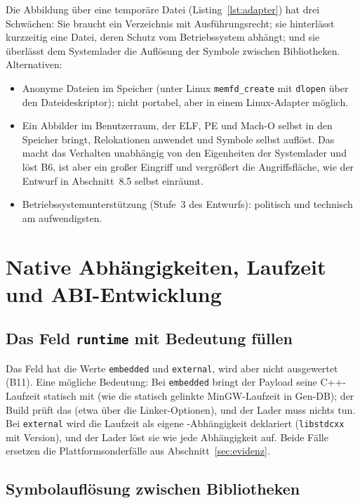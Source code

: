 Die Abbildung über eine temporäre Datei (Listing~\ref{lst:adapter}) hat drei Schwächen: Sie braucht ein Verzeichnis mit Ausführungsrecht; sie hinterlässt kurzzeitig eine Datei, deren Schutz vom Betriebssystem abhängt; und sie überlässt dem Systemlader die Auflösung der Symbole zwischen Bibliotheken. Alternativen:
\begin{itemize}
	\item Anonyme Dateien im Speicher (unter Linux \texttt{memfd\_create} mit \texttt{dlopen} über den Dateideskriptor); nicht portabel, aber in einem Linux-Adapter möglich.
	\item Ein Abbilder im Benutzerraum, der ELF, PE und Mach-O selbst in den Speicher bringt, Relokationen anwendet und Symbole selbst auflöst. Das macht das Verhalten unabhängig von den Eigenheiten der Systemlader und löst B6, ist aber ein großer Eingriff und vergrößert die Angriffsfläche, wie der Entwurf in Abschnitt~8.5 selbst einräumt.
	\item Betriebssystemunterstützung (Stufe~3 des Entwurfs): politisch und technisch am aufwendigsten.
\end{itemize}

\section{Native Abhängigkeiten, Laufzeit und ABI-Entwicklung}
\label{sec:runtime-ausblick}

\subsection{Das Feld \texttt{runtime} mit Bedeutung füllen}

Das Feld hat die Werte \texttt{embedded} und \texttt{external}, wird aber nicht ausgewertet (B11). Eine mögliche Bedeutung: Bei \texttt{embedded} bringt der Payload seine C++-Laufzeit statisch mit (wie die statisch gelinkte MinGW-Laufzeit in Gen-DB); der Build prüft das (etwa über die Linker-Optionen), und der Lader muss nichts tun. Bei \texttt{external} wird die Laufzeit als eigene \SL-Abhängigkeit deklariert (\texttt{libstdcxx} mit Version), und der Lader löst sie wie jede Abhängigkeit auf. Beide Fälle ersetzen die Plattformsonderfälle aus Abschnitt~\ref{sec:evidenz}.

\subsection{Symbolauflösung zwischen Bibliotheken}

